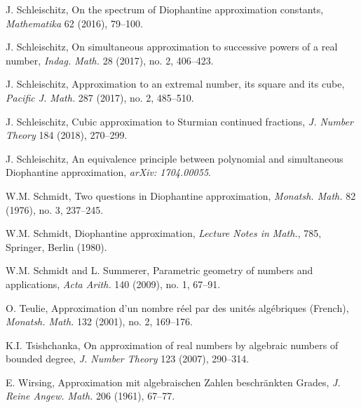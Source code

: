 \documentclass[12pt]{amsart}
\theoremstyle{definition}
\begin{document}
\begin{thebibliography}{99}
 J. Schleischitz, On the spectrum of Diophantine approximation constants,
{\em Mathematika} 62 (2016), 79--100.



 J. Schleischitz, On simultaneous approximation to successive powers of a real number, {\em Indag. Math.} 28 (2017), no. 2, 406--423.

 J. Schleischitz, Approximation to an extremal number, its square and its cube,
{\em Pacific J. Math.} 287 (2017), no. 2, 485--510.



 J. Schleischitz, Cubic approximation to Sturmian continued fractions, {\em J. Number Theory} 184 (2018), 270--299.

 J. Schleischitz, An equivalence principle
between polynomial and simultaneous Diophantine
approximation, {\em arXiv: 1704.00055}.


 W.M. Schmidt, Two questions in Diophantine approximation,
{\em Monatsh. Math.} 82 (1976), no. 3, 237--245.

 W.M. Schmidt, Diophantine approximation, {\em Lecture Notes in Math.}, 785, Springer, Berlin (1980).



 W.M. Schmidt and L. Summerer, Parametric geometry of numbers and applications, 
{\em Acta Arith.} 140 (2009), no. 1, 67--91.

 O. Teulie, Approximation d'un nombre r\'{e}el par des unit\'{e}s alg\'{e}briques (French), 
{\em Monatsh. Math.} 132 (2001), no. 2, 169--176. 

 K.I. Tsishchanka,
On approximation of real numbers by algebraic numbers of bounded degree,
{\em J. Number Theory} 123 (2007), 290--314.


 E. Wirsing, Approximation mit algebraischen Zahlen beschr\"ankten Grades,
{\em J. Reine Angew. Math.} 206 (1961), 67--77.

\end{thebibliography}
\end{document}

